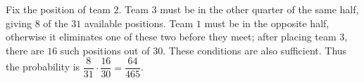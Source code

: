 Fix the position of team $2$. Team $3$ must be in the other quarter of the same half, giving $8$ of the $31$ available positions. Team $1$ must be in the opposite half, otherwise it eliminates one of these two before they meet; after placing team $3$, there are $16$ such positions out of $30$. These conditions are also sufficient. Thus the probability is $\dfrac{8}{31}\cdot\dfrac{16}{30}=\boxed{\dfrac{64}{465}}$.
